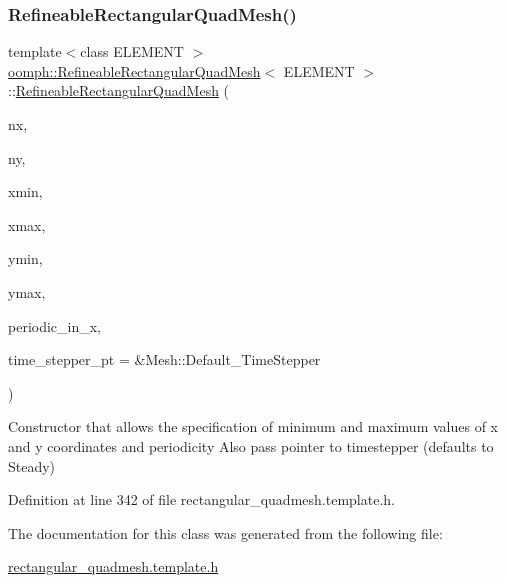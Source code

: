 \subsubsection{\texorpdfstring{Refineable\+Rectangular\+Quad\+Mesh()}{RefineableRectangularQuadMesh()}\hspace{0.1cm}{\footnotesize\ttfamily [4/4]}}
{\footnotesize\ttfamily template$<$class E\+L\+E\+M\+E\+NT $>$ \\
\hyperlink{classoomph_1_1RefineableRectangularQuadMesh}{oomph\+::\+Refineable\+Rectangular\+Quad\+Mesh}$<$ E\+L\+E\+M\+E\+NT $>$\+::\hyperlink{classoomph_1_1RefineableRectangularQuadMesh}{Refineable\+Rectangular\+Quad\+Mesh} (\begin{DoxyParamCaption}\item[{const unsigned \&}]{nx,  }\item[{const unsigned \&}]{ny,  }\item[{const double \&}]{xmin,  }\item[{const double \&}]{xmax,  }\item[{const double \&}]{ymin,  }\item[{const double \&}]{ymax,  }\item[{const bool \&}]{periodic\+\_\+in\+\_\+x,  }\item[{Time\+Stepper $\ast$}]{time\+\_\+stepper\+\_\+pt = {\ttfamily \&Mesh\+:\+:Default\+\_\+TimeStepper} }\end{DoxyParamCaption})\hspace{0.3cm}{\ttfamily [inline]}}



Constructor that allows the specification of minimum and maximum values of x and y coordinates and periodicity Also pass pointer to timestepper (defaults to Steady) 



Definition at line 342 of file rectangular\+\_\+quadmesh.\+template.\+h.



The documentation for this class was generated from the following file\+:\begin{DoxyCompactItemize}
\item 
\hyperlink{rectangular__quadmesh_8template_8h}{rectangular\+\_\+quadmesh.\+template.\+h}\end{DoxyCompactItemize}
